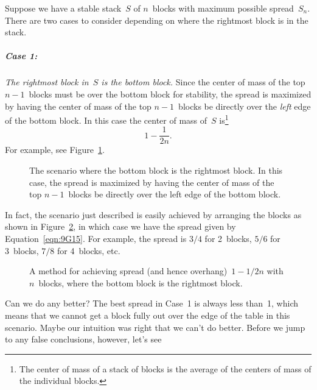 Suppose we have a stable stack~$S$ of $n$~blocks with maximum possible
spread~$S_n$.  There are two cases to consider depending on where the
rightmost block is in the stack.

\subparagraph{Case 1:}

\emph{The rightmost block in~$S$ is the bottom block.}  Since the
center of mass of the top $n - 1$~blocks must be over the bottom block
for stability, the spread is maximized by having the center of mass of
the top $n - 1$~blocks be directly over the \emph{left} edge of the
bottom block.  In this case the center of mass of~$S$ is\footnote{The
  center of mass of a stack of blocks is the average of the centers of
  mass of the individual blocks.}
\begin{equation}\label{eqn:9G15}
    1 - \frac{1}{2n}.
\end{equation}
For example, see Figure~\ref{fig:9G14}.

\begin{figure}



\caption{The scenario where the bottom block is the rightmost block.
  In this case, the spread is maximized by having the center of mass
  of the top $n-1$~blocks be directly over the left edge of the bottom
block.}

\label{fig:9G14}

\end{figure}

In fact, the scenario just described is easily achieved by arranging
the blocks as shown in Figure~\ref{fig:9G15}, in which case we have
the spread given by Equation~\ref{eqn:9G15}.  For example, the spread
is $3/4$ for 2~blocks, $5/6$ for 3~blocks, $7/8$ for 4~blocks, etc.

\begin{figure}



\caption{A method for achieving spread (and hence overhang)~$1 - 1/2n$
  with $n$~blocks, where the bottom block is the rightmost block.}

\label{fig:9G15}

\end{figure}

Can we do any better?  The best spread in Case~1 is always less
than~1, which means that we cannot get a block fully out over the edge
of the table in this scenario.  Maybe our intuition was right that we
can't do better.  Before we jump to any false conclusions, however,
let's see

